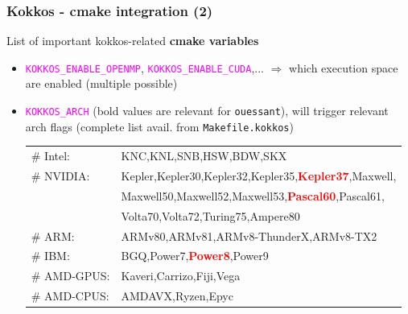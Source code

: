 \begin{frame}[fragile=singleslide]
  \frametitle{Kokkos - cmake integration (2)}

  {\large List of important kokkos-related {\bf cmake variables}}
  \begin{itemize}
  \item \textcolor{magenta}{\texttt{KOKKOS\_ENABLE\_OPENMP}}, \textcolor{magenta}{\texttt{KOKKOS\_ENABLE\_CUDA}},... $\Rightarrow$ which execution space are enabled (multiple possible)
  \item \textcolor{magenta}{\texttt{KOKKOS\_ARCH}} (bold values are relevant for \texttt{ouessant}), will trigger relevant arch flags (complete list avail. from \texttt{Makefile.kokkos})
    \begin{tabular}{ll}
      \# Intel:    & KNC,KNL,SNB,HSW,BDW,SKX\\
    \# NVIDIA:   & Kepler,Kepler30,Kepler32,Kepler35,\textcolor{red}{\bf Kepler37},Maxwell,\\
      & Maxwell50,Maxwell52,Maxwell53,\textcolor{red}{\bf Pascal60},Pascal61,\\
      & Volta70,Volta72,Turing75,Ampere80\\
    \# ARM:      &ARMv80,ARMv81,ARMv8-ThunderX,ARMv8-TX2\\
    \# IBM:      &BGQ,Power7,\textcolor{red}{\bf Power8},Power9\\
    \# AMD-GPUS: &Kaveri,Carrizo,Fiji,Vega\\
    \# AMD-CPUS: &AMDAVX,Ryzen,Epyc\\
    \end{tabular}
  \end{itemize}

\end{frame}

